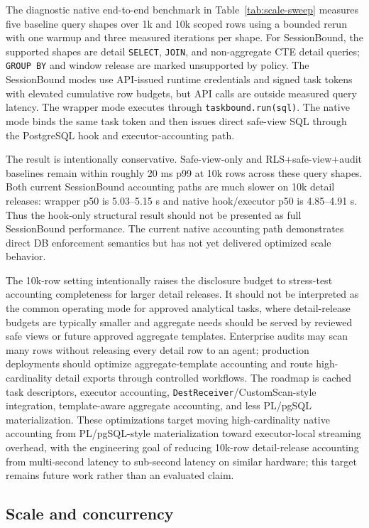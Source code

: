 \documentclass[journal]{IEEEtran}
\begin{document}
The diagnostic native end-to-end benchmark in
Table~\ref{tab:scale-sweep} measures five baseline query shapes over 1k
and 10k scoped rows using a bounded rerun with one warmup and three
measured iterations per shape. For SessionBound, the supported shapes
are detail \texttt{SELECT}, \texttt{JOIN}, and non-aggregate CTE detail
queries; \texttt{GROUP\ BY} and window release are marked unsupported by
policy. The SessionBound modes use API-issued runtime credentials and
signed task tokens with elevated cumulative row budgets, but API calls
are outside measured query latency. The wrapper mode executes through
\texttt{taskbound.run(sql)}. The native mode binds the same task token
and then issues direct safe-view SQL through the PostgreSQL hook and
executor-accounting path.

The result is intentionally conservative. Safe-view-only and
RLS+safe-view+audit baselines remain within roughly 20 ms p99 at 10k
rows across these query shapes. Both current SessionBound accounting
paths are much slower on 10k detail releases: wrapper p50 is
5.03--5.15 s and native hook/executor p50 is 4.85--4.91 s. Thus the hook-only
structural result should not be presented as full SessionBound
performance. The current native accounting path demonstrates direct DB
enforcement semantics but has not yet delivered optimized scale
behavior.

The 10k-row setting intentionally raises the disclosure budget to
stress-test accounting completeness for larger detail releases. It
should not be interpreted as the common operating mode for approved
analytical tasks, where detail-release budgets are typically smaller and
aggregate needs should be served by reviewed safe views or future
approved aggregate templates. Enterprise audits may scan many rows without
releasing every detail row to an agent; production deployments should
optimize aggregate-template accounting and route high-cardinality detail
exports through controlled workflows. The roadmap is cached task
descriptors, executor accounting, \texttt{DestReceiver}/CustomScan-style
integration, template-aware aggregate accounting, and less PL/pgSQL
materialization. These optimizations target moving high-cardinality
native accounting from PL/pgSQL-style materialization toward
executor-local streaming overhead, with the engineering goal of reducing
10k-row detail-release accounting from multi-second latency to
sub-second latency on similar hardware; this target remains future work
rather than an evaluated claim.

\hypertarget{scale-and-concurrency}{%
\subsection{Scale and concurrency}\label{scale-and-concurrency}}
\end{document}
